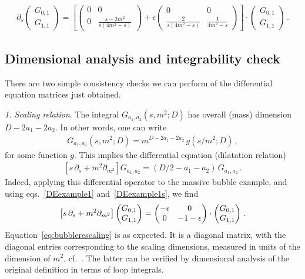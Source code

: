 \begin{align}\label{DEexample1s}
\partial_{s} \begin{pmatrix}
G_{0,1} \\
G_{1,1}
\end{pmatrix}
=
\left[
\begin{pmatrix}
0 & 0 \\
0 & \frac{s-2 m^2}{s(4 m^2-s)} 
\end{pmatrix}
+
\epsilon
\begin{pmatrix}
0 & 0 \\
\frac{2}{s(4m^2-s)} & \frac{1}{4 m^2-s} \end{pmatrix}
\right] \cdot
\begin{pmatrix}
G_{0,1} \\
G_{1,1}
\end{pmatrix}
\,.
\end{align}

\subsection{Dimensional analysis and integrability check}
\label{sec:dimensionalanalysis}

There are two simple consistency checks we can perform of the differential equation matrices just obtained. 

\smallskip

{\it 1. Scaling relation}.
The integral $G_{a_1,a_2}(s,m^2;D)$ has overall (mass) dimension $D-2 a_1 - 2 a_2$. In other words, one can write
\begin{align}\label{eq:dimension}
G_{a_1,a_2}(s,m^2;D) = m^{D-2 a_1 -2 a_2} \, g(s/m^2;D)\,,
\end{align}
for some function $g$.
This implies the differential equation 
(dilatation relation)
\begin{align}
\left[ s \, \partial_s + m^2 \partial_{m^2} \right] G_{a_1,a_2} = (D/2-a_1-a_2) \, G_{a_1,a_2} \,.
\end{align}
Indeed, applying this differential operator to the massive bubble example, and using eqs.~\eqref{DEexample1} and~\eqref{DEexample1s}, we find
\begin{align}\label{eq:bubblerescaling}
 \left[ s \, \partial_s + m^2 \partial_{m^2} \right] 
 \begin{pmatrix}
G_{0,1} \\
G_{1,1}
\end{pmatrix} =
\begin{pmatrix}
-\epsilon & 0 \\
0 & -1-\epsilon 
\end{pmatrix} \cdot
\begin{pmatrix}
G_{0,1} \\
G_{1,1}
\end{pmatrix}\,.
\end{align}
Equation~\eqref{eq:bubblerescaling} is as expected. It is a diagonal matrix, with the diagonal entries corresponding to the scaling dimensions, measured in units of the dimension of $m^2$, cf.\ . The latter can be verified by dimensional analysis of the original definition in terms of loop integrals.

